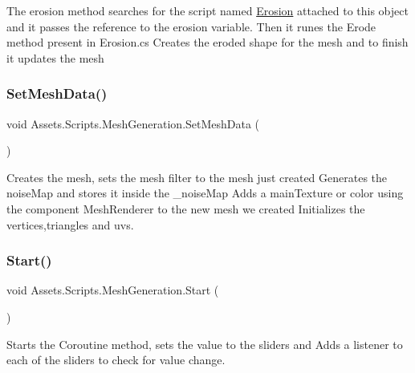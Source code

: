 The erosion method searches for the script named \mbox{\hyperlink{class_assets_1_1_scripts_1_1_erosion}{Erosion}} attached to this object and it passes the reference to the erosion variable. Then it runes the Erode method present in Erosion.\+cs Creates the eroded shape for the mesh and to finish it updates the mesh 

\mbox{\label{class_assets_1_1_scripts_1_1_mesh_generation_a132027f38358668e6f8c320b00ee9327}} 
\subsubsection{\texorpdfstring{SetMeshData()}{SetMeshData()}}
{\footnotesize\ttfamily void Assets.\+Scripts.\+Mesh\+Generation.\+Set\+Mesh\+Data (\begin{DoxyParamCaption}{ }\end{DoxyParamCaption})}



Creates the mesh, sets the mesh filter to the mesh just created Generates the noise\+Map and stores it inside the \+\_\+noise\+Map Adds a main\+Texture or color using the component Mesh\+Renderer to the new mesh we created Initializes the vertices,triangles and uvs. 

\mbox{\label{class_assets_1_1_scripts_1_1_mesh_generation_a41b690987228c88da57a68df85864fb8}} 
\subsubsection{\texorpdfstring{Start()}{Start()}}
{\footnotesize\ttfamily void Assets.\+Scripts.\+Mesh\+Generation.\+Start (\begin{DoxyParamCaption}{ }\end{DoxyParamCaption})\hspace{0.3cm}{\ttfamily [private]}}



Starts the Coroutine method, sets the value to the sliders and Adds a listener to each of the sliders to check for value change. 

